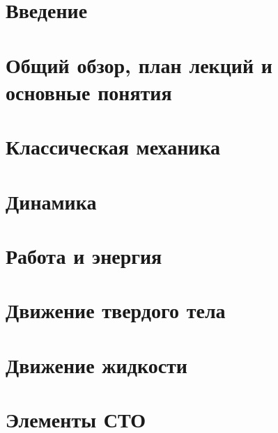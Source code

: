 \documentclass[12pt,epsfig,color,russian]{book}
\begin{document}
\frontmatter

\tableofcontents
\newpage

\chapter{Введение}


\mainmatter

\chapter{Общий обзор,  план лекций и основные понятия}


\topmargin=0cm
\hoffset -30mm
\voffset -12mm
\setlength{\unitlength}{1mm}
\parindent=10mm
\textheight=250mm
\textwidth=185mm

\chapter{Классическая механика}


\chapter{Динамика}


\chapter{Работа и энергия}


\chapter{Движение твердого тела}


\chapter{Движение жидкости}


\chapter{Элементы СТО}

\end{document}
